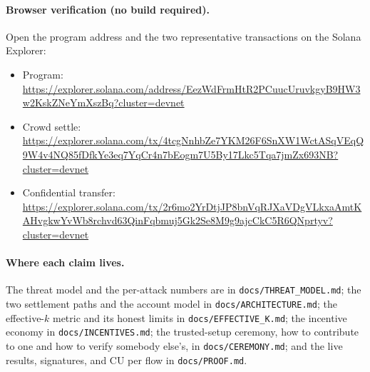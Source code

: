 \documentclass[10pt]{article}
\newcommand{\code}[1]{\texttt{#1}}
\begin{document}
\paragraph{Browser verification (no build required).} Open the program address and
the two representative transactions on the Solana Explorer:
\begin{itemize}[leftmargin=1.4em,itemsep=0.05em]
  \item Program: \url{https://explorer.solana.com/address/EezWdFrmHtR2PCuucUruvkgyB9HW3w2KskZNeYmXszBq?cluster=devnet}
  \item Crowd settle: \url{https://explorer.solana.com/tx/4tcgNnhbZe7YKM26F6SnXW1WctASqVEqQ9W4v4NQ85fDfkYe3eq7YqCr4n7bEogm7U5By17Lkc5Tqa7jmZx693NB?cluster=devnet}
  \item Confidential transfer: \url{https://explorer.solana.com/tx/2r6mo2YrDtjJP8bnVqRJXaVDgVLkxaAmtKAHvgkwYvWb8rchvd63QinFqbmuj5Gk2Se8M9g9ajcCkC5R6QNprtyv?cluster=devnet}
\end{itemize}

\paragraph{Where each claim lives.} The threat model and the per-attack numbers
are in \code{docs/THREAT\_MODEL.md}; the two settlement paths and the account
model in \code{docs/ARCHITECTURE.md}; the effective-$k$ metric and its honest
limits in \code{docs/EFFECTIVE\_K.md}; the incentive economy in
\code{docs/INCENTIVES.md}; the trusted-setup ceremony, how to contribute to one and
how to verify somebody else's, in \code{docs/CEREMONY.md}; and the live results,
signatures, and CU per flow in \code{docs/PROOF.md}.
\end{document}
